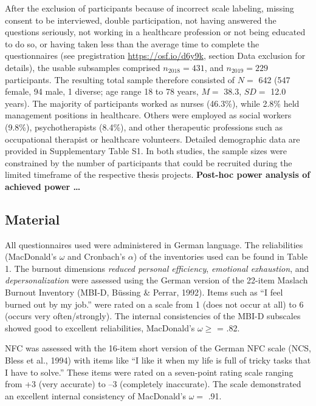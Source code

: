 \documentclass[
  man]{apa6}
\begin{document}
After the exclusion of participants because of incorrect scale labeling, missing consent to be interviewed, double participation, not having answered the questions seriously, not working in a healthcare profession or not being educated to do so, or having taken less than the average time to complete the questionnaires (see pregistration \url{https://osf.io/d6y9k}, section Data exclusion for details), the usable subsamples comprised \(n_{2018}=431\), and \(n_{2019}=229\) participants. The resulting total sample therefore consisted of \(N=\) 642 (547 female, 94 male, 1 diverse; age range 18 to 78 years, \(M=\) 38.3, \(SD=\) 12.0 years).
The majority of participants worked as nurses (46.3\%), while 2.8\% held management positions in healthcare.
Others were employed as social workers (9.8\%), psychotherapists (8.4\%), and other therapeutic professions such as occupational therapist or healthcare volunteers.
Detailed demographic data are provided in Supplementary Table S1.
In both studies, the sample sizes were constrained by the number of participants that could be recruited during the limited timeframe of the respective thesis projects. \textbf{Post-hoc power analysis of achieved power \ldots{}}

\subsection{Material}\label{material}

All questionnaires used were administered in German language.
The reliabilities (MacDonald's \(\omega\) and Cronbach's \(\alpha\)) of the inventories used can be found in Table 1.
The burnout dimensions \emph{reduced personal efficiency}, \emph{emotional exhaustion}, and \emph{depersonalization} were assessed using the German version of the 22-item Maslach Burnout Inventory (MBI-D, Büssing \& Perrar, 1992).
Items such as ``I feel burned out by my job.'' were rated on a scale from 1 (does not occur at all) to 6 (occurs very often/strongly).
The internal consistencies of the MBI-D subscales showed good to excellent reliabilities, MacDonald's \(\omega\ge\) = .82.

NFC was assessed with the 16-item short version of the German NFC scale (NCS, Bless et al., 1994) with items like ``I like it when my life is full of tricky tasks that I have to solve.'' These items were rated on a seven-point rating scale ranging from +3 (very accurate) to --3 (completely inaccurate).
The scale demonstrated an excellent internal consistency of MacDonald's \(\omega=\) .91.
\end{document}

